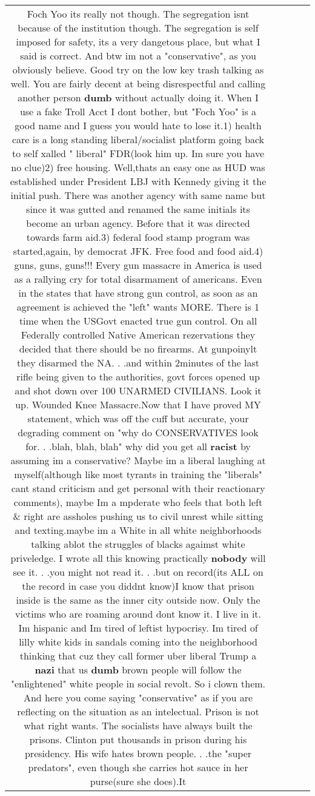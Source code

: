 \documentclass[11pt]{article}
\newlength\mylength
\begin{document}
\begin{center}
\begin{longtable}{|C{.65\mylength}|C{.30\mylength}|C{.12\mylength}|C{.12\mylength}|C{.12\mylength}|}
  \small Foch Yoo its really not though.  The segregation isnt because of the institution though. The segregation is self imposed for safety, its a very dangetous place, but what I said is correct. And btw im not a "conservative", as you obviously believe. Good try on the low key trash talking as well. You are fairly decent at being disrespectful and calling another person \textbf{dumb} without actually doing it. When I use a fake Troll Acct I dont bother, but "Foch Yoo" is a good name and I guess you would hate to lose it.1) health care is a long standing liberal/socialist platform going back to self xalled " liberal" FDR(look him up. Im sure you have no clue)2) free housing. Well,thats an easy one as HUD was established under President LBJ with Kennedy giving it the initial push. There was another agency with same name but since it was gutted and renamed the same initials its become an urban agency. Before that it was directed towards farm aid.3) federal food stamp program was started,again, by democrat JFK. Free food and food aid.4) guns, guns, guns!!! Every gun massacre in America is used as a rallying cry for total disarmament of americans. Even in the states that have strong gun control, as soon as an agreement is achieved the "left" wants MORE. There is 1 time when the USGovt enacted true gun control. On all Federally controlled Native American rezervations they decided that there should be no firearms. At gunpoinylt they disarmed the NA. . .and within 2minutes of the last rifle being given to the authorities, govt forces opened up and shot down over 100 UNARMED CIVILIANS. Look it up. Wounded Knee Massacre.Now that I have proved MY statement, which was off the cuff but accurate, your degrading comment on "why do CONSERVATIVES look for. . .blah, blah, blah" why did you get all \textbf{racist} by assuming im a conservative? Maybe im a liberal laughing at myself(although like most tyrants in training the "liberals" cant stand criticism and get personal with their reactionary comments), maybe Im a mpderate who feels that both left \& right are assholes pushing us to civil unrest while sitting and texting.maybe im a White in all white neighborhoods talking ablot the struggles of blacks agaimst white priveledge. I wrote all this knowing practically \textbf{nobody} will see it. . .you might not read it. . .but on record(its ALL on the record in case you diddnt know)I know that prison inside is the same as the inner city outside now. Only the victims who are roaming around dont know it. I live in it. Im hispanic and Im tired of leftist hypocrisy. Im tired of lilly white kids in sandals coming into the neighborhood thinking that cuz they call former uber liberal Trump a \textbf{nazi} that us \textbf{dumb} brown people will follow the "enlightened" white people in social revolt. So i clown them. And here you come saying "conservative" as if you are reflecting on the situation as an intelectual. Prison is not what right wants. The socialists have always built the prisons. Clinton put thousands in prison during his presidency. His wife hates brown people. . .the "super predators", even though she carries hot sauce in her purse(sure she does).It 
\end{longtable}
\end{center}
\end{document}
